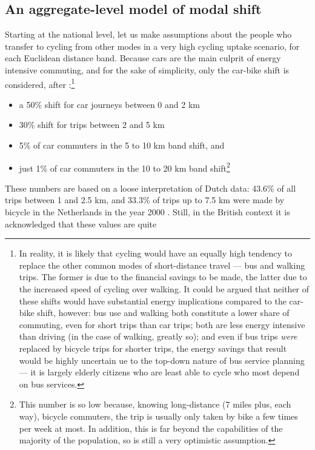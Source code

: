 \subsection{An aggregate-level model of modal shift}
Starting at the national level, let us make assumptions about the people who
transfer to cycling from other modes in a very high cycling uptake scenario,
for each Euclidean distance band. Because cars are the main culprit of energy
intensive commuting, and for the sake of simplicity, only the car-bike shift is
considered, after \citet{Lovelace2011-assessing}:\footnote{In
reality, it is likely that cycling
would have an equally high tendency to replace the other common modes of
short-distance travel --- bus
\citet{dorling2013population} and walking trips. The former is due to the
financial savings to be made, the latter due to the increased speed of cycling
over walking. It could be argued that neither of these shifts would have
substantial energy implications compared to the car-bike shift, however: bus
use and walking both constitute a lower share of commuting, even for short
trips than car trips; both are less energy intensive than driving (in the case
of walking, greatly so); and even if bus trips \emph{were} replaced by bicycle
trips for shorter trips, the energy savings that result would be highly
uncertain ue to the top-down nature of bus service planning --- it is largely
elderly citizens who are least able to cycle who most depend on bus services.
}
\begin{itemize} 
 \item a 50\% shift for car journeys between 0 and 2 km
 \item 30\% shift for trips between 2 and 5 km
 \item 5\% of car commuters in the 5 to 10 km band shift, and
 \item just 1\% of car commuters in the 10 to 20 km band
 shift\footnote{This
 number is so low because, knowing long-distance (7 miles plus, each way),
 bicycle commuters, the trip is usually only taken by bike a few times per week
at most. In addition, this is far beyond the capabilities of the majority of
the population, so is still a very optimistic assumption.
}
\end{itemize}
These numbers are based on a loose interpretation of Dutch data: 43.6\% of
all trips between
1 and 2.5 km, and 33.3\% of trips up to 7.5 km were made by bicycle in the
Netherlands in the year 2000 \citep{Rietveld2004}.
Still, in the British context it is acknowledged that these values are quite
